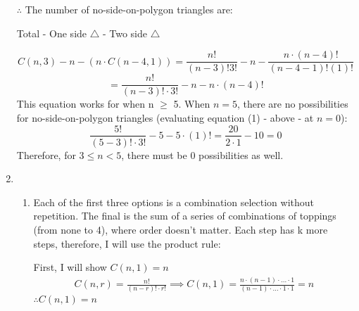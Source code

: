 \documentclass[11pt]{article}
\begin{document}
\begin{enumerate}
{\begin{enumerate}
{			      		      $\therefore$ The number of no-side-on-polygon triangles are:
			      		      \newline
			      		      \begin{center}
			      		      	Total - One side $\bigtriangleup$ - Two side $\bigtriangleup$
			      		      \end{center}
			      		      \begin{equation*}
			      		      	C(n,3) - n - (n\cdot C(n-4,1))
			      		      	= \frac{n!}{(n-3)!3!} - n - \frac{n\cdot (n-4)!}{(n-4-1)!(1)!}
			      		      \end{equation*}
			      		      \begin{equation}
			      		      	= \frac{n!}{(n-3)!\cdot 3!} - n - n\cdot (n-4)!
			      		      \end{equation}
			      		      This equation works for when n $\geq$ 5. When $n=5$, there are no possibilities for no-side-on-polygon triangles (evaluating equation (1) - above - at $n=0$):
			      		      \begin{equation*}
			      		      	\frac{5!}{(5-3)!\cdot 3!} - 5 - 5\cdot (1)!
			      		      	= \frac{20}{2\cdot 1} - 10
			      		      	= 0
			      		      \end{equation*}
			      		      Therefore, for $3 \leq n < 5$, there must be 0 possibilities as well.
			      		}
			      	\end{enumerate}
			      }
			      
			\item {
				      \begin{enumerate}
				      	\item{
				      	      Each of the first three options is a combination selection without repetition. The final is the sum of a series of combinations of toppings (from none to 4), where order doesn't matter. Each step has k more steps, therefore, I will use the product rule:
				      	      
				      	      First, I will show $C(n,1) = n$
				      	      \begin{eqnarray*}
				      	      	C(n,r) = \frac{n!}{(n-r)!\cdot r!}
				      	      	\implies
				      	      	C(n,1)= \frac{n\cdot (n-1)\cdot\ldots\cdot 1}{(n-1)\cdot\ldots\cdot 1\cdot 1}
				      	      	= n
				      	      \end{eqnarray*}
				      	      $\therefore C(n,1) = n$
				      	}
				      	

\end{enumerate}}
\end{enumerate}
\end{document}
